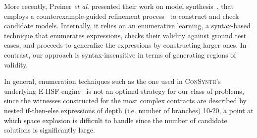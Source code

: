More recently, Preiner \textit{et al}. presented their work on model synthesis~\cite{preiner2017counterexample}, %
that employs a counterexample-guided refinement process~\cite{reynolds2015counterexample} 
to construct and check candidate models.
Internally, it relies on an enumerative learning, a syntax-based technique that enumerates expressions, checks their validity against
ground test cases, and proceeds to generalize the expressions by constructing larger ones.
In contrast, our approach is syntax-insensitive in terms of generating regions of validity.
\iffalse
On top of that, CEGMS has only been tested against the theory of Boolean Vectors (BV, and BV$_{LNIRA}$), while \jsynvg supports the mixed theories of linear integer and real arithmetic.
\fi
In general, enumeration techniques such as the one used in \textsc{ConSynth}'s underlying E-HSF engine~\cite{beyene2014constraint} is not an optimal strategy for our class of problems, since the witnesses constructed for the most complex contracts are described by nested if-then-else expressions of depth (i.e. number of branches) 10-20, a point at which space explosion is difficult to handle since the number of candidate solutions is significantly large.
